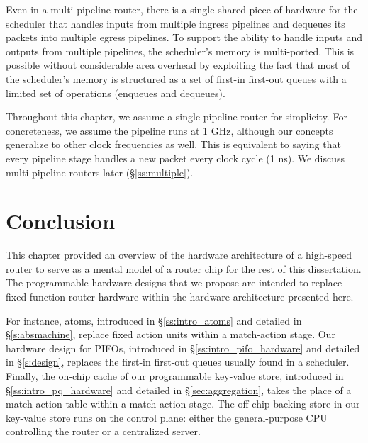 Even in a multi-pipeline router, there is a single shared piece of hardware for
the scheduler that handles inputs from multiple ingress pipelines and dequeues
its packets into multiple egress pipelines. To support the ability to handle
inputs and outputs from multiple pipelines, the scheduler's memory is
multi-ported.  This is possible without considerable area overhead by
exploiting the fact that most of the scheduler's memory is structured as a set
of first-in first-out queues with a limited set of operations (\eg enqueues and
dequeues).  

Throughout this chapter, we assume a single pipeline router for simplicity. For
concreteness, we assume the pipeline runs at 1 GHz, although our concepts
generalize to other clock frequencies as well. This is equivalent to saying
that every pipeline stage handles a new packet every clock cycle (1 ns). We
discuss multi-pipeline routers later (\S\ref{ss:multiple}). 

\section{Conclusion}
This chapter provided an overview of the hardware architecture of a high-speed
router to serve as a mental model of a router chip for the rest of this
dissertation.  The programmable hardware designs that we propose are intended
to replace fixed-function router hardware within the hardware architecture
presented here.

For instance, atoms, introduced in \S\ref{ss:intro_atoms} and detailed in
\S\ref{s:absmachine}, replace fixed action units within a match-action stage.
Our hardware design for PIFOs, introduced in \S\ref{ss:intro_pifo_hardware} and
detailed in \S\ref{s:design}, replaces the first-in first-out queues usually
found in a scheduler. Finally, the on-chip cache of our programmable key-value
store, introduced in \S\ref{ss:intro_pq_hardware} and detailed in
\S\ref{sec:aggregation}, takes the place of a match-action table within a
match-action stage. The off-chip backing store in our key-value store runs on
the control plane: either the general-purpose CPU controlling the router or a
centralized server. 

